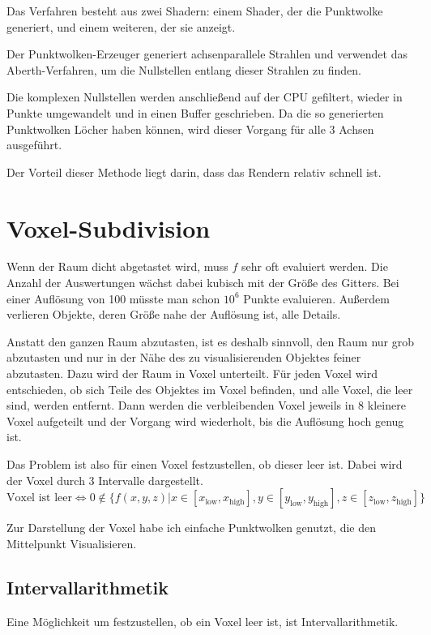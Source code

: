 \documentclass[
	ngerman,%
	accentcolor=9c,%
	ruledheaders=section,%
	class=report,%
	thesis={type=bachelor},%
	fontsize=11pt,%
	parskip=half-,%
	custommargins=true,%
	marginpar=false,%
]{tudapub}
\begin{document}
Das Verfahren besteht aus zwei Shadern: einem Shader, der die Punktwolke generiert, und einem weiteren, der sie anzeigt.

Der Punktwolken-Erzeuger generiert achsenparallele Strahlen und verwendet das Aberth-Verfahren, um die Nullstellen entlang dieser Strahlen zu finden.

Die komplexen Nullstellen werden anschließend auf der CPU gefiltert, wieder in Punkte umgewandelt und in einen Buffer geschrieben. Da die so generierten Punktwolken Löcher haben können, wird dieser Vorgang für alle 3 Achsen ausgeführt. 


Der Vorteil dieser Methode liegt darin, dass das Rendern relativ schnell ist.


\section{Voxel-Subdivision}
\label{sec:Voxel-Subdivision}
Wenn der Raum dicht abgetastet wird, muss $f$ sehr oft evaluiert werden. Die Anzahl der Auswertungen wächst dabei kubisch mit der Größe des Gitters.
Bei einer Auflösung von 100 müsste man schon $10^6$ Punkte evaluieren. Außerdem verlieren Objekte, deren Größe nahe der Auflösung ist, alle Details.

Anstatt den ganzen Raum abzutasten, ist es deshalb sinnvoll, den Raum nur grob abzutasten und nur in der Nähe des zu visualisierenden Objektes feiner abzutasten. Dazu wird der Raum in Voxel unterteilt. Für jeden Voxel wird entschieden, ob sich Teile des Objektes im Voxel befinden, und alle Voxel, die leer sind, werden entfernt.
Dann werden die verbleibenden Voxel jeweils in 8 kleinere Voxel aufgeteilt und der Vorgang wird wiederholt, bis die Auflösung hoch genug ist.

Das Problem ist also für einen Voxel festzustellen, ob dieser leer ist. Dabei wird der Voxel durch 3 Intervalle dargestellt.
\[
\text{Voxel ist leer} \iff 0 \notin \{ f(x,y,z) | 
x \in [x_{\text{low}}, x_{\text{high}}], 
y \in [y_{\text{low}}, y_{\text{high}}], 
z \in [z_{\text{low}}, z_{\text{high}}]
\}
\]

Zur Darstellung der Voxel habe ich einfache Punktwolken genutzt, die den Mittelpunkt Visualisieren.

\subsection{Intervallarithmetik}
Eine Möglichkeit um festzustellen, ob ein Voxel leer ist, ist Intervallarithmetik. 
\end{document}
